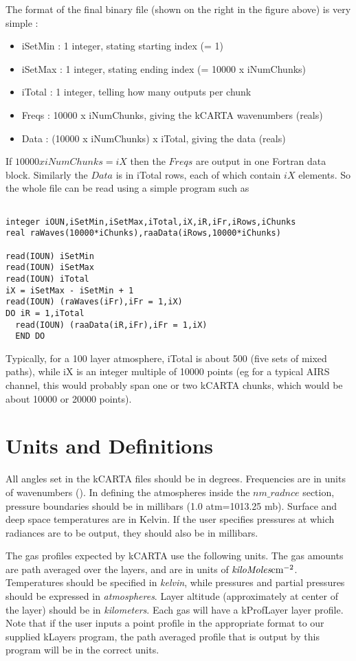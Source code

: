 \documentclass[11pt]{article}
\newcommand{\kc}{\textsf{kCARTA}\xspace}
\newcommand{\cm}{\hbox{cm}}
\begin{document}
The format of the final binary file (shown on the right in the figure above)
is very simple :
\begin{itemize}
\item iSetMin : 1 integer, stating starting index (= 1)
\item iSetMax : 1 integer, stating ending index (= 10000 x iNumChunks)
\item iTotal  : 1 integer, telling how many outputs per chunk
\item Freqs   : 10000 x iNumChunks, giving the kCARTA wavenumbers (reals)
\item Data    : (10000 x iNumChunks) x iTotal, giving the data (reals)
\end{itemize}
If  $ 10000 x iNumChunks = iX$ then the $Freqs$ are output in one Fortran
data block. Similarly the $Data$ is in iTotal rows, each of which contain 
$iX$  elements. So the whole file can be read using a simple program such as

\begin{verbatim}

integer iOUN,iSetMin,iSetMax,iTotal,iX,iR,iFr,iRows,iChunks
real raWaves(10000*iChunks),raaData(iRows,10000*iChunks)

read(IOUN) iSetMin
read(IOUN) iSetMax
read(IOUN) iTotal
iX = iSetMax - iSetMin + 1
read(IOUN) (raWaves(iFr),iFr = 1,iX)
DO iR = 1,iTotal 
  read(IOUN) (raaData(iR,iFr),iFr = 1,iX) 
  END DO 
\end{verbatim}
Typically, for a 100 layer atmosphere, iTotal is about 500 (five sets of 
mixed paths), while iX is an integer multiple of 10000 points (eg for a 
typical AIRS channel, this would probably span one or two kCARTA chunks, which
would be about 10000 or 20000 points).

\section{Units and Definitions}

All angles set in the \kc files should be in degrees.
Frequencies are in units of wavenumbers (\wn).  In defining the
atmospheres inside the $nm\_radnce$ section, pressure boundaries should be
in millibars (1.0 atm=1013.25 mb).  Surface and deep space temperatures
are in Kelvin.  If the user specifies pressures at which radiances are
to be output, they should also be in millibars.

The gas profiles expected by \kc use the following units.  The gas
amounts are path averaged over the layers, and are in units of
$\hbox{\em kiloMoles} \cm^{-2}$.  Temperatures should be
specified in {\em kelvin}, while pressures and partial pressures
should be expressed in {\em atmospheres}.  Layer altitude
(approximately at center of the layer) should be in {\em
kilometers}.  Each gas will have a kProfLayer layer profile.  Note that if
the user inputs a point profile in the appropriate format to our
supplied {\sf kLayers} program, the path averaged profile that is
output by this program will be in the correct units.
\end{document}
